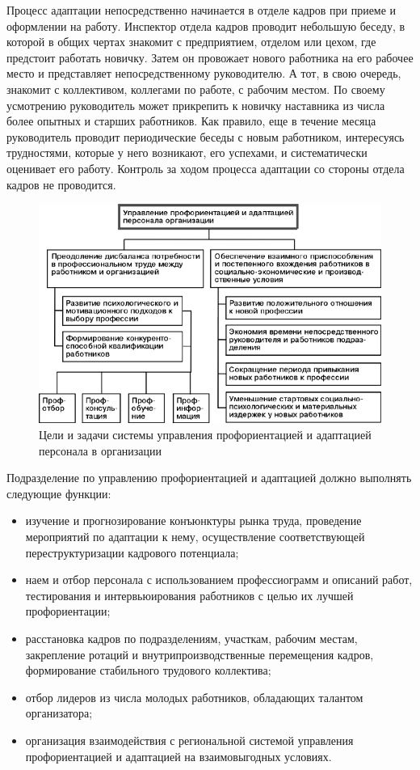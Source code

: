 \documentclass[a4paper,12pt,oneside,final]{extarticle}
\makeatletter
\numberwithin{equation}{section}
\def\maxwidth#1{\ifdim\Gin@nat@width>#1 #1\else\Gin@nat@width\fi}
\makeatother
\begin{document}
Процесс адаптации непосредственно начинается в отделе кадров при приеме и оформлении на работу. 
Инспектор отдела кадров проводит небольшую беседу, в которой в общих чертах знакомит с предприятием, отделом или цехом, где предстоит работать новичку. 
Затем он провожает нового работника на его рабочее место и представляет непосредственному руководителю. 
А тот, в свою очередь, знакомит с коллективом, коллегами по работе, с рабочим местом. 
По своему усмотрению руководитель может прикрепить к новичку наставника из числа более опытных и старших работников. 
Как правило, еще в течение месяца руководитель проводит периодические беседы с новым работником, интересуясь трудностями, которые у него возникают, его успехами, и систематически оценивает его работу. 
Контроль за ходом процесса адаптации со стороны отдела кадров не проводится.

\begin{figure}[h]
	\centering
	\includegraphics[width=\maxwidth{\textwidth}]{management-figures/adapt_goal}
	\caption{Цели и задачи системы управления профориентацией и адаптацией персонала в организации}
\end{figure}

Подразделение по управлению профориентацией и адаптацией должно выполнять следующие функции:
\begin{itemize}
	\item изучение и прогнозирование конъюнктуры рынка труда, проведение мероприятий по адаптации к нему, осуществление соответствующей переструктуризации кадрового потенциала;
	\item наем и отбор персонала с использованием профессиограмм и описаний работ, тестирования и интервьюирования работников с целью их лучшей профориентации;
	\item расстановка кадров по подразделениям, участкам, рабочим местам, закрепление ротаций и внутрипроизводственные перемещения кадров, формирование стабильного трудового коллектива;
	\item отбор лидеров из числа молодых работников, обладающих талантом организатора;
	\item организация взаимодействия с региональной системой управления профориентацией и адаптацией на взаимовыгодных условиях.
\end{itemize}
\end{document}
